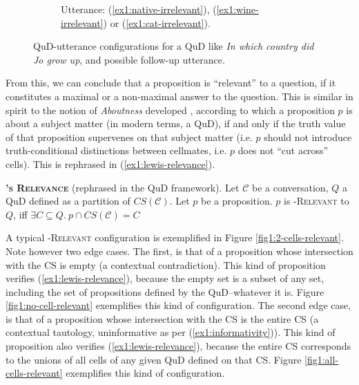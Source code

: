 \begin{figure}[H]
\begin{subfigure}[t]{.24\linewidth}
		\caption{Utterance: (\ref{ex1:native-irrelevant}), (\ref{ex1:wine-irrelevant}) or (\ref{ex1:cat-irrelevant}).}
	\end{subfigure}
	\caption{QuD-utterance configurations for a QuD like \textit{In which country did Jo grow up}, and possible follow-up utterance.}\label{fig1:relevance-example}
\end{figure}

From this, we can conclude that a proposition is ``relevant'' to a question, if it constitutes a maximal or a non-maximal answer to the question. This is similar in spirit to the notion of \textit{Aboutness} developed \cite{Lewis1988}, according to which a proposition $p$ is about a subject matter (in modern terms, a QuD), if and only if the truth value of that proposition supervenes on that subject matter (i.e. $p$ should not introduce truth-conditional distinctions between cellmates, i.e. $p$ does not ``cut across'' cells). This is rephrased in (\ref{ex1:lewis-relevance}). 

\begin{exe}
	\ex\label{ex1:lewis-relevance} {\textsc{\textbf{\citeauthor{Lewis1988}'s Relevance}} (rephrased in the QuD framework). Let $\mathcal{C}$ be a conversation, $Q$ a QuD defined as a partition of $CS(\mathcal{C})$. Let $p$ be a proposition. $p$ is \textsc{\citeauthor{Lewis1988}-Relevant} to $Q$, iff $\exists C \subseteq Q. \ p \cap CS(\mathcal{C}) = C$}
\end{exe}


A typical \textsc{\citeauthor{Lewis1988}-Relevant} configuration is exemplified in Figure \ref{fig1:2-cells-relevant}. Note however two edge cases. The first, is that of a proposition whose intersection with the CS is empty (a contextual contradiction). This kind of proposition verifies (\ref{ex1:lewis-relevance}), because the empty set is a subset of any set, including the set of propositions defined by the QuD--whatever it is. Figure \ref{fig1:no-cell-relevant} exemplifies this kind of configuration. The second edge case, is that of a proposition whose intersection with the CS is the entire CS (a contextual tautology, uninformative as per (\ref{ex1:informativity})). This kind of proposition also verifies (\ref{ex1:lewis-relevance}), because the entire CS corresponds to the unions of all cells of any given QuD defined on that CS. Figure \ref{fig1:all-cells-relevant} exemplifies this kind of configuration. 

